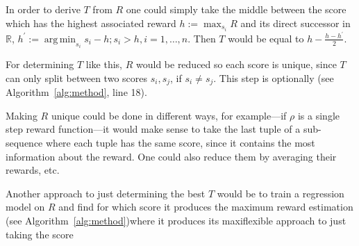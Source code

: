 \documentclass[twoside,11pt]{article}
\DeclareMathOperator*{\argmin}{arg\,min}
\begin{document}
In order to derive $T$ from $R$ one could simply take the
middle between the score which has the highest associated
reward $h := \max_{s_i} R$ and its direct successor in
$\mathbb{R}$,
$h^\prime := \argmin_{s_i} s_i - h; s_i > h, i=1,\dots,n$.
Then $T$ would be equal to $h - \frac{h-h^\prime}{2}$.

For determining $T$ like this, $R$ would be reduced so each
score is unique, since $T$ can only split between two
scores $s_i, s_j$, if $s_i \neq s_j$.
This step is optionally
(see Algorithm~\ref{alg:method}, line 18).

Making $R$ unique could be done in different ways, for
example---if $\rho$ is a single step reward function---it
would make sense to take the last tuple of a sub-sequence
where each tuple has the same score, since it contains the
most information about the reward.
One could also reduce them by averaging their rewards, etc.

Another approach to just determining the best $T$ would be
to train a regression model on $R$ and find for which
score it produces the maximum reward estimation
(see Algorithm~\ref{alg:method})where it
produces its maxiflexible approach to just taking the score
\end{document}
